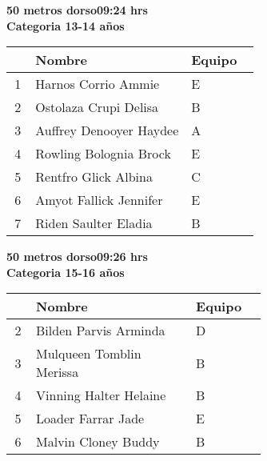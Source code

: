 \begin{minipage}{0.95\linewidth}\vspace{0.5cm} 
\begin{flushleft}
\textbf{
\hspace{-0.15cm}50 metros dorso\hspace{1.5cm}09:24 hrs \\Categoria 13-14 años}\vspace{-0.2cm} 
\end{flushleft}
\begin{tabular}{cp{0.63\linewidth}l}
\hline
& \textbf{Nombre} & \textbf{Equipo} \\ \hline
1 & Harnos Corrio Ammie & E \\ 
2 & Ostolaza Crupi Delisa & B \\ 
3 & Auffrey Denooyer Haydee & A \\ 
4 & Rowling Bolognia Brock & E \\ 
5 & Rentfro Glick Albina & C \\ 
6 & Amyot Fallick Jennifer & E \\ 
7 & Riden Saulter Eladia & B \\ 
\end{tabular}
\end{minipage}
\begin{minipage}{0.95\linewidth}\vspace{0.5cm} 
\begin{flushleft}
\textbf{
\hspace{-0.15cm}50 metros dorso\hspace{1.5cm}09:26 hrs \\Categoria 15-16 años}\vspace{-0.2cm} 
\end{flushleft}
\begin{tabular}{cp{0.63\linewidth}l}
\hline
& \textbf{Nombre} & \textbf{Equipo} \\ \hline
2 & Bilden Parvis Arminda & D \\ 
3 & Mulqueen Tomblin Merissa & B \\ 
4 & Vinning Halter Helaine & B \\ 
5 & Loader Farrar Jade & E \\ 
6 & Malvin Cloney Buddy & B \\ 
\end{tabular}
\end{minipage}
